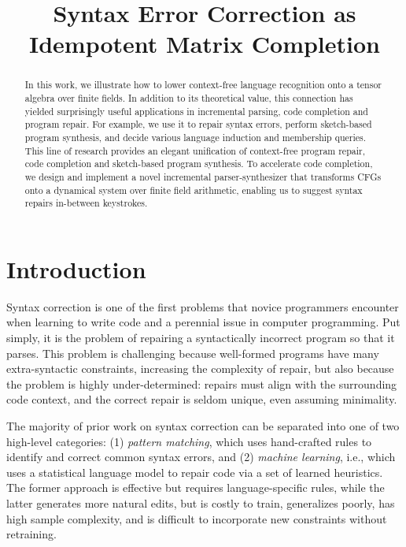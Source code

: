 \documentclass[sigplan,review,anonymous,acmsmall]{acmart}\settopmatter{printfolios=false,printccs=false,printacmref=false}
\begin{document}
\title{Syntax Error Correction as Idempotent Matrix Completion}
\begin{abstract}
In this work, we illustrate how to lower context-free language recognition onto a tensor algebra over finite fields. In addition to its theoretical value, this connection has yielded surprisingly useful applications in incremental parsing, code completion and program repair. For example, we use it to repair syntax errors, perform sketch-based program synthesis, and decide various language induction and membership queries. This line of research provides an elegant unification of context-free program repair, code completion and sketch-based program synthesis. To accelerate code completion, we design and implement a novel incremental parser-synthesizer that transforms CFGs onto a dynamical system over finite field arithmetic, enabling us to suggest syntax repairs in-between keystrokes.
\end{abstract}

\maketitle

\section{Introduction}

Syntax correction is one of the first problems that novice programmers encounter when learning to write code and a perennial issue in computer programming. Put simply, it is the problem of repairing a syntactically incorrect program so that it parses. This problem is challenging because well-formed programs have many extra-syntactic constraints, increasing the complexity of repair, but also because the problem is highly under-determined: repairs must align with the surrounding code context, and the correct repair is seldom unique, even assuming minimality.

The majority of prior work on syntax correction can be separated into one of two high-level categories: (1) \textit{pattern matching}, which uses hand-crafted rules to identify and correct common syntax errors, and (2) \textit{machine learning}, i.e., which uses a statistical language model to repair code via a set of learned heuristics. The former approach is effective but requires language-specific rules, while the latter generates more natural edits, but is costly to train, generalizes poorly, has high sample complexity, and is difficult to incorporate new constraints without retraining.
\end{document}
